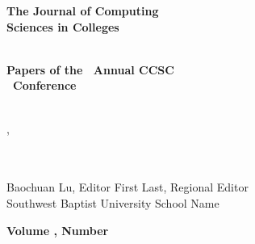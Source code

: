 \begin{textsf}

\begin{center}
\textbf{\Huge{
The Journal of Computing\\
Sciences in Colleges\\
}}\\
\end{center}

\vspace{10pt}
\vspace{10pt}
\vspace{10pt}

\begin{center}
\textbf{\Large{
Papers of the \confOrdinal\ Annual CCSC\\
\confName\ Conference\\
}}\\
\end{center}

\vspace{10pt}

\begingroup
\centering
\large{\confDates, \confYear}\\
\large{\confSchool}\\
\large{\confCity}\\
\endgroup

\vfill

{\parindent0pt
Baochuan Lu, Editor \hfill First Last, Regional Editor\\
Southwest Baptist University \hfill School Name\\
}

\vspace{10pt}

{\parindent0pt
\textbf{\Large Volume \journalVolume, Number \journalNumber} \hfill
\textbf{\Large \journalMonth\ \journalYear}\\
}
\end{textsf}
